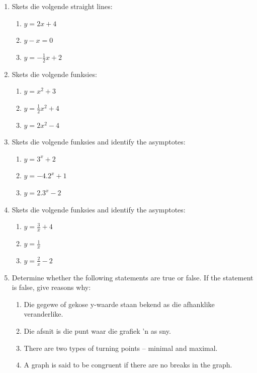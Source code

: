 \begin{eocexercises}{}
\nopagebreak
\begin{enumerate}[noitemsep, label=\textbf{\arabic*}. ] 
\item Skets die volgende straight lines: 
    \begin{enumerate}[noitemsep, label=\textbf{\alph*}. ] 
    \item $y=2x+4$ 
    \item $y-x=0$ 
    \item $y=-\frac{1}{2}x+2$
    \end{enumerate}
\item Skets die volgende funksies: 
    \begin{enumerate}[noitemsep, label=\textbf{\alph*}. ] 
    \item $y={x}^{2}+3$ 
    \item $y=\frac{1}{2}{x}^{2}+4$
    \item $y=2{x}^{2}-4$
    \end{enumerate}
\item Skets die volgende funksies and identify the asymptotes: 
    \begin{enumerate}[noitemsep, label=\textbf{\alph*}. ] 
    \item $y={3}^{x}+2$ 
    \item $y=-4.{2}^{x}+1$ 
    \item $y=2.{3}^{x}-2$ 
    \end{enumerate}
\item Skets die volgende funksies and identify the asymptotes: 
    \begin{enumerate}[noitemsep, label=\textbf{\alph*}. ] 
    \item $y=\frac{3}{x}+4$ 
    \item $y=\frac{1}{x}$ 
    \item $y=\frac{2}{x}-2$ 
    \end{enumerate}
\item Determine whether the following statements are true or false. If the statement is false, give reasons why:
    \begin{enumerate}[noitemsep, label=\textbf{\alph*}. ] 
    \item  Die gegewe of gekose y-waarde staan bekend as die afhanklike veranderlike.
    \item Die afsnit is die punt waar die grafiek ’n as sny.
    \item There are two types of turning points -- minimal and maximal.
    \item A graph is said to be congruent if there are no breaks in the graph.

\end{enumerate}
\end{enumerate}
\end{eocexercises}
